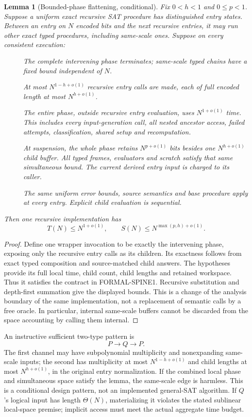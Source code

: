 \documentclass[11pt]{article}
\newtheorem{lemma}{Lemma}
\begin{document}
\begin{lemma}[Bounded-phase flattening, conditional]
Fix $0<h<1$ and $0\le p<1$. Suppose a uniform exact recursive SAT procedure has
distinguished entry states. Between an entry on $N$ encoded bits and the next
recursive entries, it may run other exact typed procedures, including
same-scale ones. Suppose on every consistent execution:
\begin{description}
\item[] The complete intervening phase terminates; same-scale typed chains have
a fixed bound independent of $N$.
\item[] At most $N^{1-h+o(1)}$ recursive entry calls are made, each of full
encoded length at most $N^{h+o(1)}$.
\item[] The entire phase, outside recursive entry evaluation, uses
$N^{1+o(1)}$ time. This includes every input-generation call, all nested ancestor
access, failed attempts, classification, shared setup and recomputation.
\item[] At suspension, the whole phase retains $N^{p+o(1)}$ bits besides one
$N^{h+o(1)}$ child buffer. All typed frames, evaluators and scratch satisfy that
same simultaneous bound. The current derived entry input is charged to its
caller.
\item[] The same uniform error bounds, source semantics and base procedure apply
at every entry. Explicit child evaluation is sequential.
\end{description}
Then one recursive implementation has
\[
T(N)\le N^{1+o(1)},\qquad
S(N)\le N^{\max(p,h)+o(1)}.
\]
\end{lemma}
\begin{proof}
Define one wrapper invocation to be exactly the intervening phase, exposing
only the recursive entry calls as its children. Its exactness follows from
exact typed composition and source-matched child answers. The hypotheses
provide its full local time, child count, child lengths and retained workspace.
Thus it satisfies the contract in FORMAL-SPINE1. Recursive substitution and
depth-first summation give the displayed bounds. This is a change of the
analysis boundary of the same implementation, not a replacement of semantic
calls by a free oracle. In particular, internal same-scale buffers cannot be
discarded from the space accounting by calling them internal.
\end{proof}

An instructive sufficient two-type pattern is
\[
P\longrightarrow Q\longrightarrow P.
\]
The first channel may have subpolynomial multiplicity and nonexpanding
same-scale inputs; the second has multiplicity at most
$N^{1-h+o(1)}$ and child lengths at most $N^{h+o(1)}$, in the original entry
normalization. If the combined local phase and simultaneous space satisfy
the lemma, the same-scale edge is harmless. This is a conditional design
pattern, not an implemented general-SAT algorithm. If $Q$'s logical input has
length $\Theta(N)$, materializing it violates the stated sublinear local-space
premise; implicit access must meet the actual aggregate time budget.
\end{document}
